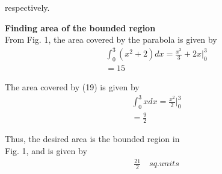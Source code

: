 \documentclass[journal,12pt,twocolumn]{IEEEtran}
\begin{document}
respectively.

\vspace{0.2cm}
\textbf{Finding area of the bounded region} \\
From Fig. 1, the area covered by the parabola is given by
\begin{align}
\int_{0}^{3} (x^2+2)dx =  \frac{x^3}{3} + 2x \Big|_0^3 \\
=15 
\end{align}

The area covered by (19) is given by
\begin{align}
\int_{0}^{3} xdx =  \frac{x^2}{2} \Big|_0^3 \\
= \frac{9}{2}
\end{align}

Thus, the desired area is the bounded region in
\\Fig. 1, and is given by
\begin{align}
\frac{21}{2} \quad sq.units
\end{align}

\end{document}
